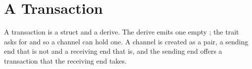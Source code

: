 \section{A Transaction}
\label{sec:x-transaction}

A transaction is a struct and a derive. The derive emits one empty
; the trait asks for  and  so a
channel can hold one. A channel is created as a pair, a sending end
that is not  and a receiving end that is, and the sending
end offers a transaction that the receiving end takes.


